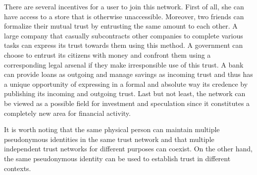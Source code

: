 \documentclass[11pt]{llncs}
\theoremstyle{definition}
\begin{document}
     There are several incentives for a user to join this network. First of all, she can have access to a store that is
     otherwise unaccessible. Moreover, two friends can formalize their mutual trust by entrusting the same amount to each
     other. A large company that casually subcontracts other companies to complete various tasks can express its trust
     towards them using this method. A government can choose to entrust its citizens with money and confront them using a
     corresponding legal arsenal if they make irresponsible use of this trust. A bank can provide loans as outgoing and
     manage savings as incoming trust and thus has a unique opportunity of expressing in a formal and absolute way its
     credence by publishing its incoming and outgoing trust. Last but not least, the network can be viewed as a possible
     field for investment and speculation since it constitutes a completely new area for financial activity.

     It is worth noting that the same physical person can maintain multiple pseudonymous identities in the same trust network
     and that multiple independent trust networks for different purposes can coexist. On the other hand, the same
     pseudonymous identity can be used to establish trust in different contexts.
\end{document}
